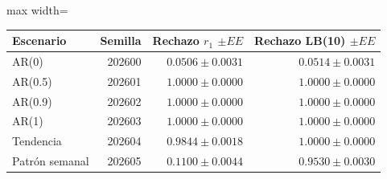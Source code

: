 \begin{center}\small\setlength{\tabcolsep}{4pt}
\begin{adjustbox}{max width=\textwidth}\begin{tabular}{lrrr}
\toprule
Escenario & Semilla & Rechazo $r_1$ $\pm EE$ & Rechazo LB(10) $\pm EE$ \\ \midrule
AR(0) & 202600 & $0.0506\pm 0.0031$ & $0.0514\pm 0.0031$ \\
AR(0.5) & 202601 & $1.0000\pm 0.0000$ & $1.0000\pm 0.0000$ \\
AR(0.9) & 202602 & $1.0000\pm 0.0000$ & $1.0000\pm 0.0000$ \\
AR(1) & 202603 & $1.0000\pm 0.0000$ & $1.0000\pm 0.0000$ \\
Tendencia & 202604 & $0.9844\pm 0.0018$ & $1.0000\pm 0.0000$ \\
Patrón semanal & 202605 & $0.1100\pm 0.0044$ & $0.9530\pm 0.0030$ \\
\bottomrule\end{tabular}\end{adjustbox}\end{center}
